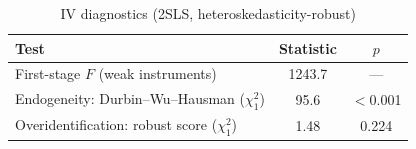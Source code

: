 \begin{table}[htbp]\centering
\caption{IV diagnostics (2SLS, heteroskedasticity-robust)}
\begin{tabular}{lcc}
\toprule
Test & Statistic & \(p\) \\
\midrule
First-stage \(F\) (weak instruments) & 1243.7 & --- \\
Endogeneity: Durbin--Wu--Hausman (\(\chi^2_1\)) &   95.6 & \(<\)0.001 \\
Overidentification: robust score (\(\chi^2_1\)) &  1.48 & 0.224 \\
\bottomrule
\end{tabular}
\end{table}

